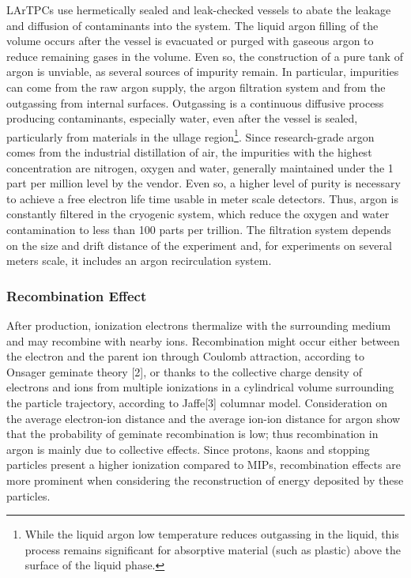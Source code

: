 LArTPCs use  hermetically sealed and leak-checked vessels to abate the leakage and diffusion of contaminants into the system. The liquid argon filling of the volume occurs after the vessel is evacuated or purged with gaseous argon \cite{1748-0221-9-07-P07005} to reduce remaining gases in the volume. Even so, the construction of a pure tank of argon is unviable, as several sources of impurity remain.  In particular, impurities can come from the raw argon supply, the argon filtration system and from the outgassing from internal surfaces. Outgassing is a continuous diffusive process  producing contaminants, especially water, even after the vessel is sealed, particularly from materials in the ullage region\footnote{While the liquid argon low temperature reduces outgassing in the liquid, this process remains significant for absorptive material (such as plastic) above the surface of the liquid phase.}.  Since research-grade argon comes from the industrial distillation of air, the impurities with the highest concentration are nitrogen, oxygen and water, generally maintained under the 1 part per million level by the vendor.  Even so, a higher level of purity is necessary to achieve a free electron life time usable in meter scale detectors. Thus, argon  is constantly  filtered in the cryogenic system, which reduce the oxygen and water contamination to less than 100 parts per trillion. The filtration system depends on the size and drift distance of the experiment and, for experiments on several meters scale, it includes an argon recirculation system.



\subsubsection{Recombination Effect}
After production, ionization electrons thermalize with the surrounding medium and may recombine with nearby ions. Recombination might occur either between the electron and the parent ion through Coulomb attraction, according to Onsager geminate theory  [2], or thanks to the collective charge density of electrons and ions from multiple ionizations in a cylindrical volume surrounding the particle trajectory, according to Jaffe[3]  columnar model. 
Consideration on the  average electron-ion distance and the average ion-ion distance for argon show that the probability of geminate recombination is low; thus recombination in argon is mainly due to collective effects\cite{1748-0221-8-08-P08005}.  Since protons, kaons and stopping particles present a higher ionization compared to MIPs, recombination effects are more prominent when considering the reconstruction of energy deposited by these particles.

